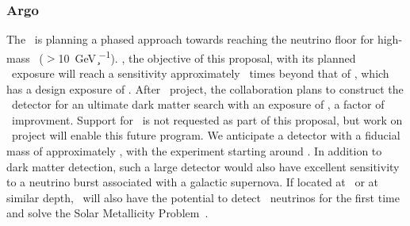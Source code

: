 \subsubsection{Argo}
\label{sec:Argo}

The \GADMC\ is planning a phased approach towards reaching the neutrino floor for high-mass \WIMPs\ ($>$\SI{10}{\GeV\per\c\squared}).  \DSks, the objective of this proposal, with its planned \DSkExtendedExposure\ exposure will reach a sensitivity approximately \DSkImprovementOverDEAP\ times beyond that of \DEAP, which has a design exposure of \DEAPExposure.  After \DSk\ project, the collaboration plans to construct the \Argo\ detector for an ultimate dark matter search with an exposure of \ArgoExtendedExposure, a factor of \ArgoImprovementOverDSk\ improvment.  Support for \Argo\ is not requested as part of this proposal, but work on \DSk\ project will enable this future program.  We anticipate a detector with a fiducial mass of approximately \ArgoFiducialMass, with the experiment starting around \ArgoStartDate. In addition to dark matter detection, such a large detector would also have excellent sensitivity to a neutrino burst associated with a galactic supernova.  If located at \SNOLAB\ or at similar depth, \Argo\ will also have the potential to detect \CNO\ neutrinos for the first time and solve the Solar Metallicity Problem~\cite{Franco:2016ex}. 